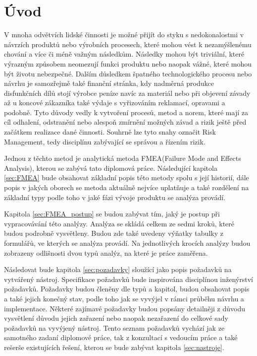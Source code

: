 \chapter{Úvod}
\label{sec:Uvod}
V mnoha odvětvích lidské činnosti je možné přijít do styku s nedokonalostmi v návrzích produktů nebo výrobních procesech, které mohou vést k nezamýšlenému chování a více či méně važným následkům. Následky mohou být triviální, které výrazným způsobem neomezují funkci produktu nebo naopak vážné, které mohou být životu nebezpečné. Dalším důsledkem špatného technologického procesu nebo návrhu je samozřejmě také finanční stránka, kdy nadměrná produkce disfunkčních dílů stojí výrobce peníze navíc za materiál nebo při objevení závady až u koncové zákazníka také výdaje s vyřizováním reklamací, opravami a podobně. Tyto důvody vedly k vytvoření procesů, metod a norem, které mají za cíl odhalení, odstranění nebo alespoň zmírnění možných závad a rizik ještě před začátkem realizace dané činnosti. Souhrně lze tyto snahy označit Risk Management, tedy disciplínu zabývající se správou a řízením rizik. 

Jednou z těchto metod je analytická metoda FMEA(Failure Mode and Effects Analysis), kterou se zabývá tato diplomová práce. Následující kapitola  \ref{sec:FMEA} bude obsahovat základní popis této metody spolu s její historií, dále popis v jakých oborech se metoda aktuálně nejvíce uplatňuje a také rozdělení na základní typy podle toho v jaké fázi vývoje produktu se analýza provádí.

Kapitola \ref{sec:FMEA_postup} se budou zabývat tím, jaký je postup při vypracovávání této analýzy. Analýza se skládá celkem ze sedmi kroků, které budou podrobně vysvětleny. Budou zde také uvedeny výňatky tabulky z formulářů, ve kterých se analýza provádí. Na jednotlivých krocích analýzy budou zobrazeny odlišnosti dvou typů analýz, na které je práce zaměřena.

Následovat bude kapitola \ref{sec:pozadavky} sloužící jako popis požadavků na vytvářený nástroj. Specifikace požadavků bude inspirována disciplínou inženýrství požadavků. Požadavky budou členěny dle typů a kapitol, budou obsahovat popis a také jejich konečný stav, podle toho jak se vyvýjel v rámci průběhu návrhu a implementace. Některé zajímavé požadavky budou popsány detailněji z důvodu vysvětlení důvodu jejich zařazení nebo naopak nezařazení do celkové sady požadavků na vyvýjený nástroj. Tento seznam požadavků vychází jak ze samotného zadaní diplomové práce, tak z konzultací s vedoucím práce a také rešerše existujících řešení, kterou se bude zabývat kapitola \ref{sec:nastroje}. 

